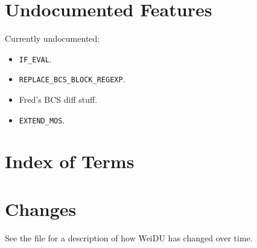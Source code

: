 \documentclass{article}
\begin{document}
\section{Undocumented Features}

Currently undocumented:
\begin{itemize}
\item {\tt IF_EVAL}.
\item {\tt REPLACE_BCS_BLOCK_REGEXP}.
\item Fred's BCS diff stuff.
\item {\tt EXTEND_MOS}.
\end{itemize}

\section{Index of Terms}

\printindex

\section{Changes}
See the file
for a description of how WeiDU
has changed over time.
\end{document}
